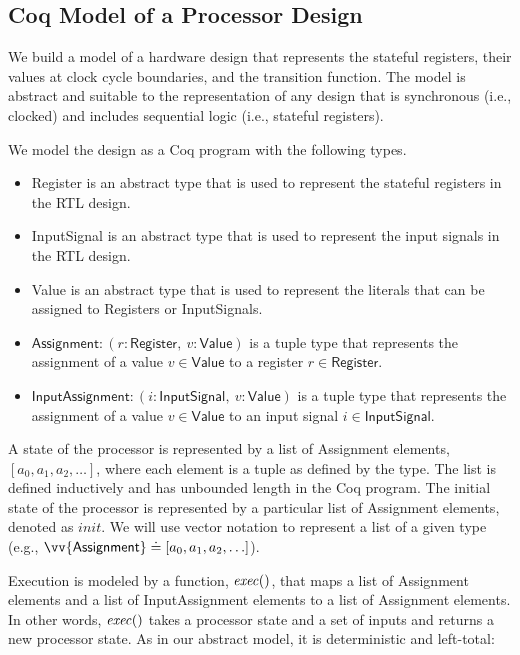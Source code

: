 \subsection{Coq Model of a Processor Design}
We build a model of a hardware design that represents the stateful
registers, their values at clock cycle boundaries, and the transition
function. The model is abstract and suitable to the representation of any design
that is synchronous (i.e., clocked) and includes sequential logic (i.e.,
stateful registers).

We model the design as a Coq program with the following types.
\begin{itemize}
\item \textsf{Register} is an abstract type that is used to represent the
  stateful registers in the RTL design.
\item \textsf{InputSignal} is an abstract type that is used to represent the
  input signals in the RTL design.
\item \textsf{Value} is an abstract type that is used to represent the
  literals that can be assigned to \textsf{Register}s or \textsf{InputSignal}s.
\item $\textsf{Assignment} : (r: \textsf{Register},~ v: \textsf{Value})$ is a
  tuple type that represents the assignment of a value $v \in \textsf{Value}$
  to a register $r \in \textsf{Register}$.
\item $\textsf{InputAssignment} : (i: \textsf{InputSignal},~ v:
  \textsf{Value})$ is a tuple type that represents the assignment of a
  value $v \in \textsf{Value}$ to an input signal $i \in \textsf{InputSignal}$.
\end{itemize}

A state of the processor is represented by a list of \textsf{Assignment} elements, $[a_0, a_1, a_2,
\ldots]$, where each element is a tuple as defined by the type. The list is
defined inductively and has unbounded length in the Coq
program. The initial state of the processor is represented by a particular list
of \textsf{Assignment} elements, denoted as $\mathit{init}$. We will use vector notation to
represent a list of a given type (e.g., $\vv{\textsf{Assignment}} \doteq [a_0,
a_1, a_2, \ldots]$).

Execution is modeled by a function, $\mathit{exec}()$, that maps a list of
\textsf{Assignment} elements and
a list of \textsf{InputAssignment} elements to a list of
\textsf{Assignment} elements. In other words, $\mathit{exec}()$ takes a
processor state and a set of inputs and returns a new processor state. As in our abstract model, it is deterministic and left-total:


